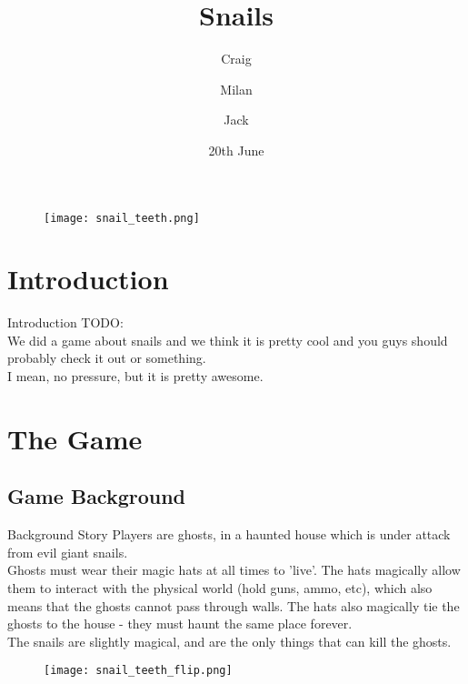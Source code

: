 \documentclass{beamer}
\title{Snails}
\author{Craig \and Milan \and Jack}
\date{20th June}
\begin{document}
\begin{frame}
  \titlepage
  \vspace{\baselineskip}
  \begin{figure}
    \texttt{[image: snail\_teeth.png]}
  \end{figure}
\end{frame}

\section{Introduction}

\begin{frame}{Introduction}
  TODO:\\
  \vspace{\baselineskip}
  We did a game about snails and we think it is pretty cool and you guys should probably check it out or something. \\
  \vspace{\baselineskip}
  I mean, no pressure, but it is pretty awesome.
\end{frame}


\section{The Game}
\subsection{Game Background}

\begin{frame}{Background Story}
  Players are ghosts, in a haunted house which is under attack from evil giant snails.\\
  Ghosts must wear their magic hats at all times to 'live'. The hats magically allow them to interact with the physical world (hold guns, ammo, etc), which also means that the ghosts cannot pass through walls. The hats also magically tie the ghosts to the house - they must haunt the same place forever.\\
  The snails are slightly magical, and are the only things that can kill the ghosts.\\
  \vspace{\baselineskip}
  \begin{figure}
    \hfill
    \texttt{[image: snail\_teeth\_flip.png]}
  \end{figure}
\end{frame}
\end{document}
